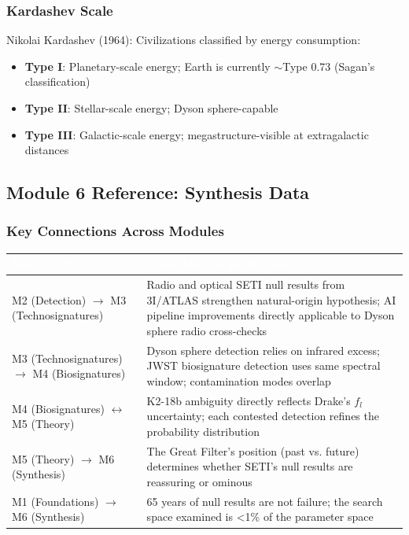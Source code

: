\documentclass[11pt,letterpaper]{article}
\newcommand{\tableheader}[1]{\textbf{\sffamily\textcolor{white}{#1}}}
\begin{document}
\subsubsection{Kardashev Scale}

Nikolai Kardashev (1964): Civilizations classified by energy consumption:
\begin{itemize}[leftmargin=1.5em]
  \item \textbf{Type I}: Planetary-scale energy; Earth is currently $\sim$Type 0.73 (Sagan's classification)
  \item \textbf{Type II}: Stellar-scale energy; Dyson sphere-capable
  \item \textbf{Type III}: Galactic-scale energy; megastructure-visible at extragalactic distances
\end{itemize}

\subsection{Module 6 Reference: Synthesis Data}

\subsubsection{Key Connections Across Modules}

\begin{center}
\begin{tabularx}{\textwidth}{L{4cm}X}
\toprule
{}
\tableheader{Module Pair} & \tableheader{Cross-Module Relationship} \\
\midrule
M2 (Detection) $\rightarrow$ M3 (Technosignatures) & Radio and optical SETI null results from 3I/ATLAS strengthen natural-origin hypothesis; AI pipeline improvements directly applicable to Dyson sphere radio cross-checks \\
M3 (Technosignatures) $\rightarrow$ M4 (Biosignatures) & Dyson sphere detection relies on infrared excess; JWST biosignature detection uses same spectral window; contamination modes overlap \\
M4 (Biosignatures) $\leftrightarrow$ M5 (Theory) & K2-18b ambiguity directly reflects Drake's $f_l$ uncertainty; each contested detection refines the probability distribution \\
M5 (Theory) $\rightarrow$ M6 (Synthesis) & The Great Filter's position (past vs. future) determines whether SETI's null results are reassuring or ominous \\
M1 (Foundations) $\rightarrow$ M6 (Synthesis) & 65 years of null results are not failure; the search space examined is \textless 1\% of the parameter space \\
\bottomrule
\end{tabularx}
\end{center}
\end{document}
